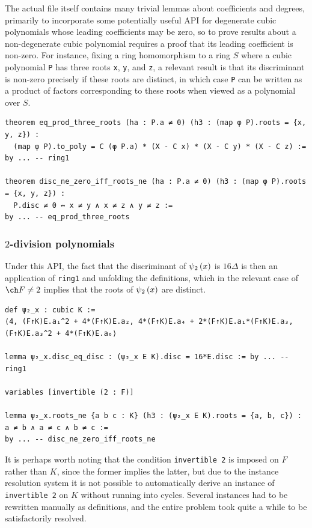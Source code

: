 The actual file itself contains many trivial lemmas about coefficients and degrees, primarily to incorporate some potentially useful API for degenerate cubic polynomials whose leading coefficients may be zero, so to prove results about a non-degenerate cubic polynomial requires a proof that its leading coefficient is non-zero. For instance, fixing a ring homomorphism to a ring $ S $ where a cubic polynomial \texttt{P} has three roots \texttt{x}, \texttt{y}, and \texttt{z}, a relevant result is that its discriminant is non-zero precisely if these roots are distinct, in which case \texttt{P} can be written as a product of factors corresponding to these roots when viewed as a polynomial over $ S $.

\begin{lstlisting}[frame=single]
theorem eq_prod_three_roots (ha : P.a ≠ 0) (h3 : (map φ P).roots = {x, y, z}) :
  (map φ P).to_poly = C (φ P.a) * (X - C x) * (X - C y) * (X - C z) :=
by ... -- ring1

theorem disc_ne_zero_iff_roots_ne (ha : P.a ≠ 0) (h3 : (map φ P).roots = {x, y, z}) :
  P.disc ≠ 0 ↔ x ≠ y ∧ x ≠ z ∧ y ≠ z :=
by ... -- eq_prod_three_roots
\end{lstlisting}

\subsubsection{\texorpdfstring{$ 2 $}{2}-division polynomials}

Under this API, the fact that the discriminant of $ \psi_2\br{x} $ is $ 16\Delta $ is then an application of \texttt{ring1} and unfolding the definitions, which in the relevant case of $ \ch F \ne 2 $ implies that the roots of $ \psi_2\br{x} $ are distinct.

\begin{lstlisting}[frame=single]
def ψ₂_x : cubic K :=
⟨4, (F↑K)E.a₁^2 + 4*(F↑K)E.a₂, 4*(F↑K)E.a₄ + 2*(F↑K)E.a₁*(F↑K)E.a₃, (F↑K)E.a₃^2 + 4*(F↑K)E.a₆⟩

lemma ψ₂_x.disc_eq_disc : (ψ₂_x E K).disc = 16*E.disc := by ... -- ring1

variables [invertible (2 : F)]

lemma ψ₂_x.roots_ne {a b c : K} (h3 : (ψ₂_x E K).roots = {a, b, c}) : a ≠ b ∧ a ≠ c ∧ b ≠ c :=
by ... -- disc_ne_zero_iff_roots_ne
\end{lstlisting}

It is perhaps worth noting that the condition \texttt{invertible 2} is imposed on $ F $ rather than $ K $, since the former implies the latter, but due to the instance resolution system it is not possible to automatically derive an instance of \texttt{invertible 2} on $ K $ without running into cycles. Several instances had to be rewritten manually as definitions, and the entire problem took quite a while to be satisfactorily resolved.

